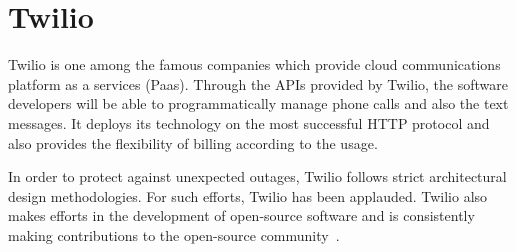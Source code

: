\section{Twilio}

Twilio is one among the famous companies which provide cloud communications
platform as a services (Paas). Through the APIs provided by Twilio, the software
developers will be able to programmatically manage phone calls and also the text
messages. It deploys its technology on the most successful HTTP protocol and
also provides the flexibility of billing according to the usage.

In order to protect against unexpected outages, Twilio follows strict
architectural design methodologies. For such efforts, Twilio has been applauded.
Twilio also makes efforts in the development of open-source software and is
consistently making contributions to the open-source community~\cite{hid-sp18-406-Twilio}.



